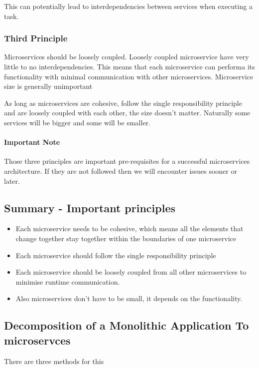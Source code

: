 \begin{note}
    This can potentially lead to interdependencies between services when executing a task.
\end{note}

\subsubsection{Third Principle}
Microservices should be loosely coupled.
Loosely coupled microservice have very little to no interdependencies.
This means that each microservice can performa its functionality with minimal communication with other microservices.
Microservice size is generally unimportant

As long as microservices are cohesive, follow the single responsibility principle and are loosely coupled with each other, the size doesn't matter.
Naturally some services will be bigger and some will be smaller.

\paragraph{Important Note}
Those three principles are important pre-requisites for a successful microservices architecture.
If they are not followed then we will encounter issues sooner or later.

\subsection{Summary - Important principles}
\begin{itemize}
    \item Each microservice needs to be cohesive, which means all the elements that change together stay together within the boundaries of one microservice
    \item Each microservice should follow the single responsibility principle
    \item Each microservice should be loosely coupled from all other microservices to minimise runtime communication.
    \item Also microservices don't have to be small, it depends on the functionality.
\end{itemize}

\subsection{Decomposition of a Monolithic Application To microservces}
There are three methods for this

